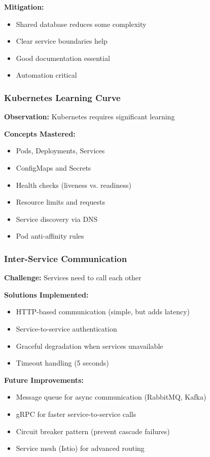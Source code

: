 \documentclass[12pt,a4paper]{article}
\begin{document}
\textbf{Mitigation:}
\begin{itemize}
    \item Shared database reduces some complexity
    \item Clear service boundaries help
    \item Good documentation essential
    \item Automation critical
\end{itemize}

\subsubsection{Kubernetes Learning Curve}
\textbf{Observation:} Kubernetes requires significant learning

\textbf{Concepts Mastered:}
\begin{itemize}
    \item Pods, Deployments, Services
    \item ConfigMaps and Secrets
    \item Health checks (liveness vs. readiness)
    \item Resource limits and requests
    \item Service discovery via DNS
    \item Pod anti-affinity rules
\end{itemize}

\subsubsection{Inter-Service Communication}
\textbf{Challenge:} Services need to call each other

\textbf{Solutions Implemented:}
\begin{itemize}
    \item HTTP-based communication (simple, but adds latency)
    \item Service-to-service authentication
    \item Graceful degradation when services unavailable
    \item Timeout handling (5 seconds)
\end{itemize}

\textbf{Future Improvements:}
\begin{itemize}
    \item Message queue for async communication (RabbitMQ, Kafka)
    \item gRPC for faster service-to-service calls
    \item Circuit breaker pattern (prevent cascade failures)
    \item Service mesh (Istio) for advanced routing
\end{itemize}
\end{document}
